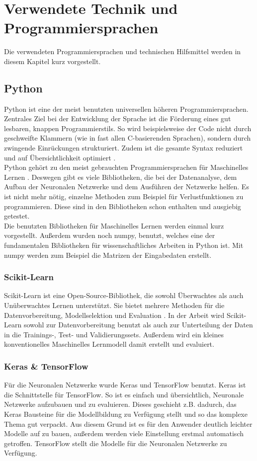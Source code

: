 \section{Verwendete Technik und Programmiersprachen} \label{Kapitel: Technik}
Die verwendeten Programmiersprachen und technischen Hilfsmittel werden in diesem Kapitel kurz vorgestellt.
\subsection{Python}
Python ist eine der meist benutzten universellen höheren Programmiersprachen.  Zentrales Ziel bei der Entwicklung der Sprache ist die Förderung eines gut lesbaren, knappen Programmierstils. So wird beispielsweise der Code nicht durch geschweifte Klammern (wie in fast allen C-basierenden Sprachen), sondern durch zwingende Einrückungen strukturiert.  Zudem ist die gesamte Syntax reduziert und auf Übersichtlichkeit optimiert \cite{Steyer_2018}.\\
Python gehört zu den meist gebrauchten Programmiersprachen für Maschinelles Lernen \cite{url:ML_PL-20210901}.  Deswegen gibt es viele Bibliotheken,  die bei der Datenanalyse,  dem Aufbau der Neuronalen Netzwerke und dem Ausführen der Netzwerke helfen. Es ist nicht mehr nötig, einzelne Methoden zum Beispiel für Verlustfunktionen zu programmieren.  Diese sind in den Bibliotheken schon enthalten und ausgiebig getestet.\\
Die benutzten Bibliotheken für Maschinelles Lernen werden einmal kurz vorgestellt.  Außerdem wurden noch numpy, benutzt, welches eine der fundamentalen Bibliotheken für wissenschaftliches Arbeiten in Python ist. \cite{url:numpy-20210907} Mit numpy werden zum Beispiel die Matrizen der Eingabedaten erstellt.
\subsubsection{Scikit-Learn}
Scikit-Learn ist eine Open-Source-Bibliothek,  die sowohl Überwachtes als auch Unüberwachtes Lernen unterstützt.  Sie bietet mehrere Methoden für die Datenvorbereitung,  Modellselektion und Evaluation \cite{url:scikit-learn-20210907}.
In der Arbeit wird Scikit-Learn sowohl zur Datenvorbereitung benutzt als auch   zur Unterteilung der Daten in die Trainings-, Test- und Validierungssets.  Außerdem wird ein kleines konventionelles Maschinelles Lernmodell damit erstellt und evaluiert.
\subsubsection{Keras \& TensorFlow} 
\label{Keras}
Für die Neuronalen Netzwerke wurde Keras und TensorFlow benutzt.  Keras ist  die Schnittstelle für TensorFlow.  So ist es einfach und übersichtlich,  Neuronale Netzwerke aufzubauen und zu evaluieren.  Dieses geschieht z.B. dadurch, das Keras Bausteine für die  Modellbildung  zu Verfügung stellt und so das komplexe Thema gut verpackt.  Aus diesem Grund ist es für den Anwender deutlich leichter Modelle auf zu bauen,  außerdem werden viele Einstellung erstmal automatisch getroffen. TensorFlow stellt die Modelle für die Neuronalen Netzwerke zu Verfügung.
